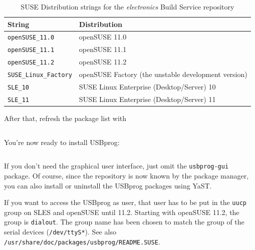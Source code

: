 \documentclass[bibtotoc,UKenglish,halfparskip,oneside,DIV12]{scrreprt}
\begin{document}
\begin{table}[ht]
  \centering
  \begin{tabular}{|p{4cm}p{10cm}|}
    \hline
    \textbf{String}                 & \textbf{Distribution}                               \\
    \hline
    \hline
    \texttt{openSUSE\_11.0}         & openSUSE 11.0                                       \\
    \texttt{openSUSE\_11.1}         & openSUSE 11.1                                       \\
    \texttt{openSUSE\_11.2}         & openSUSE 11.2                                       \\
    \texttt{SUSE\_Linux\_Factory}   & openSUSE Factory (the unstable development version) \\
    \texttt{SLE\_10}                & SUSE Linux Enterprise (Desktop/Server) 10           \\
    \texttt{SLE\_11}                & SUSE Linux Enterprise (Desktop/Server) 11           \\
    \hline
  \end{tabular}
  \caption{SUSE Distribution strings for the \emph{electronics} Build Service repository}
  \label{tab:susedistributions}
\end{table}

After that, refresh the package list with

\begin{lstlisting}[style=inline]
% sudo zypper ref
\end{lstlisting}

You're now ready to install USBprog:

\begin{lstlisting}[style=inline]
% sudo zypper install usbprog usbprog-gui
\end{lstlisting}

If you don't need the graphical user interface, just omit the \texttt{usbprog-gui} package. Of
course, since the repository is now known by the package manager, you can also install or uninstall
the USBprog packages using YaST.

If you want to access the USBprog as user, that user has to be put in the \texttt{uucp} group on
SLES and openSUSE until 11.2. Starting with openSUSE 11.2, the group is \texttt{dialout}. The group
name has been chosen to match the group of the serial devices (\texttt{/dev/ttyS*}).  See also
\texttt{/usr/share/doc/packages/usbprog/README.SUSE}.
\end{document}
